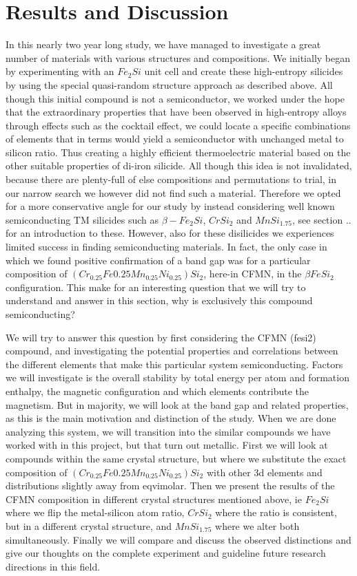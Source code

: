 \chapter{Results and Discussion}
\label{sec:R&D}

In this nearly two year long study, we have managed to investigate a great number of materials with various structures and compositions. We initially began by experimenting with an $Fe_2Si$ unit cell and create these high-entropy silicides by using the special quasi-random structure approach as described above. All though this initial compound is not a semiconductor, we worked under the hope that the extraordinary properties that have been observed in high-entropy alloys through effects such as the cocktail effect, we could locate a specific combinations of elements that in terms would yield a semiconductor with unchanged metal to silicon ratio. Thus creating a highly efficient thermoelectric material based on the other suitable properties of di-iron silicide.  All though this idea is not invalidated, because there are plenty-full of else compositions and permutations to trial, in our narrow search we however did not find such a material. Therefore we opted for a more conservative angle for our study by instead considering well known semiconducting TM silicides such as $\beta - Fe_2Si$, $CrSi_2$ and $MnSi_{1.75}$, see section .. for an introduction to these. However, also for these disilicides we experiences limited success in finding semiconducting materials. In fact, the only case in which we found positive confirmation of a band gap was for a particular composition of $(Cr_{0.25}Fe{0.25}Mn_{0.25}Ni_{0.25})Si_2$, here-in CFMN, in the $\beta FeSi_2$ configuration. This make for an interesting question that we will try to understand and answer in this section, why is exclusively this compound semiconducting?  

We will try to answer this question by first considering the CFMN (fesi2) compound, and investigating the potential properties and correlations between the different elements that make this particular system semiconducting. Factors we will investigate is the overall stability by total energy per atom and formation enthalpy, the magnetic configuration and which elements contribute the magnetism. But in majority, we will look at the band gap and related properties, as this is the main motivation and distinction of the study. When we are done analyzing this system, we will transition into the similar compounds we have worked with in this project, but that turn out metallic. First we will look at compounds within the same crystal structure, but where we substitute the exact composition of $(Cr_{0.25}Fe{0.25}Mn_{0.25}Ni_{0.25})Si_2$ with other 3d elements and distributions slightly away from eqvimolar. Then we present the results of the CFMN composition in different crystal structures mentioned above, ie $Fe_2Si$ where we flip the metal-silicon atom ratio, $CrSi_2$ where the ratio is consistent, but in a different crystal structure, and $MnSi_{1.75}$ where we alter both simultaneously. Finally we will compare and discuss the observed distinctions and give our thoughts on the complete experiment and guideline future research directions in this field.     

